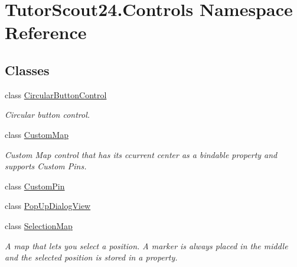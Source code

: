\hypertarget{namespace_tutor_scout24_1_1_controls}{}\section{Tutor\+Scout24.\+Controls Namespace Reference}
\label{namespace_tutor_scout24_1_1_controls}
\subsection*{Classes}
\begin{DoxyCompactItemize}
\item 
class \mbox{\hyperlink{class_tutor_scout24_1_1_controls_1_1_circular_button_control}{Circular\+Button\+Control}}
\begin{DoxyCompactList}\small\item\em Circular button control. \end{DoxyCompactList}\item 
class \mbox{\hyperlink{class_tutor_scout24_1_1_controls_1_1_custom_map}{Custom\+Map}}
\begin{DoxyCompactList}\small\item\em Custom Map control that has its ccurrent center as a bindable property and supports Custom Pins. \end{DoxyCompactList}\item 
class \mbox{\hyperlink{class_tutor_scout24_1_1_controls_1_1_custom_pin}{Custom\+Pin}}
\item 
class \mbox{\hyperlink{class_tutor_scout24_1_1_controls_1_1_pop_up_dialog_view}{Pop\+Up\+Dialog\+View}}
\item 
class \mbox{\hyperlink{class_tutor_scout24_1_1_controls_1_1_selection_map}{Selection\+Map}}
\begin{DoxyCompactList}\small\item\em A map that lets you select a position. A marker is always placed in the middle and the selected position is stored in a property. \end{DoxyCompactList}\end{DoxyCompactItemize}
